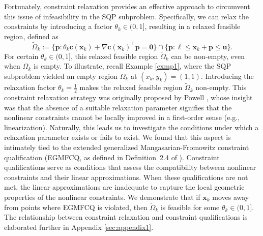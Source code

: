 \documentclass[aos]{imsart}
\numberwithin{equation}{section}
\theoremstyle{plain}
\begin{document}
Fortunately, constraint relaxation provides an effective approach to circumvent this issue of infeasibility in the SQP subproblem. Specifically, we can relax the constraints by introducing a factor $\theta_k \in (0,1]$, resulting in a relaxed feasible region, defined as
\begin{equation*}
    \widetilde{\Omega}_k := \{\bm{p}: \theta_k \bm{c}(\bm{x}_{k})+\nabla \bm{c}(\bm{x}_k)^{\top}\bm{p}=\bm{0}\} \cap \{\bm{p}: \bm{\ell} \leq \bm{x}_k + \bm{p} \leq \bm{u}\}.
\end{equation*}
For certain $\theta_k \in (0,1]$, this relaxed feasible region $ \widetilde{\Omega}_k$ can be non-empty, even when $\Omega_k$ is empty.
To illustrate, recall Example \ref{exmp1}, where the SQP subproblem yielded an empty region $\Omega_k$ at $(x_k,y_k) = (1,1)$. 
Introducing the relaxation factor $\theta_k = \frac{1}{2}$ makes the relaxed feasible region $\widetilde{\Omega}_k$ non-empty. 
This constraint relaxation strategy was originally proposed by Powell \cite{powell2006fast}, whose insight was that the absence of a suitable relaxation parameter signifies that the nonlinear constraints cannot be locally improved in a first-order sense (e.g., linearization). 
Naturally, this leads us to investigate the conditions under which a relaxation parameter exists or fails to exist. 
We found that this aspect is intimately tied to the extended generalized Mangasarian-Fromowitz constraint qualification (EGMFCQ, as defined in Definition~2.4 of \cite{xu2015smoothing}). 
Constraint qualifications serve as conditions that assess the compatibility between nonlinear constraints and their linear approximations. 
When these qualifications are not met, the linear approximations are inadequate to capture the local geometric properties of the nonlinear constraints. 
We demonstrate that if $\bm{x}_k$ moves away from points where EGMFCQ is violated, then $\widetilde{\Omega}_k$ is feasible for some $\theta_k \in (0,1]$. 
The relationship between constraint relaxation and constraint qualifications is elaborated further in Appendix \ref{sec:appendix1}.
\end{document}
